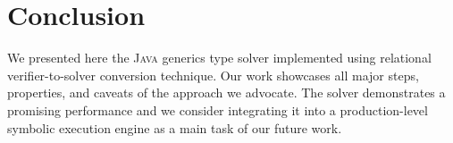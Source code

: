 \section{Conclusion}
\label{sec:conclusion}

We presented here the \textsc{Java} generics type solver implemented using relational verifier-to-solver
conversion technique. Our work showcases all major steps, properties, and caveats of the approach we advocate.
The solver demonstrates a promising performance and we consider integrating it into a production-level
symbolic execution engine as a main task of our future work.
